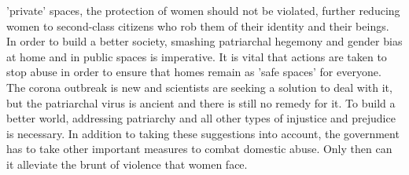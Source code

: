 \begin{multicols}{2}
'private' spaces, the protection of women should not be violated, further reducing women to
second-class citizens who rob them of their identity and their beings. In order to build a better
society, smashing patriarchal hegemony and gender bias at home and in public spaces is
imperative. It is vital that actions are taken to stop abuse in order to ensure that homes remain
as 'safe spaces' for everyone. The corona outbreak is new and scientists are seeking a solution
to deal with it, but the patriarchal virus is ancient and there is still no remedy for it. To build a
better world, addressing patriarchy and all other types of injustice and prejudice is necessary.
In addition to taking these suggestions into account, the government has to take other
important measures to combat domestic abuse. Only then can it alleviate the brunt of violence
that women face. 
\end{multicols}
